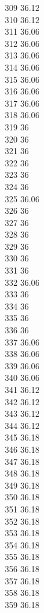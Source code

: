 309	36.12\\
310	36.12\\
311	36.06\\
312	36.06\\
313	36.06\\
314	36.06\\
315	36.06\\
316	36.06\\
317	36.06\\
318	36.06\\
319	36\\
320	36\\
321	36\\
322	36\\
323	36\\
324	36\\
325	36.06\\
326	36\\
327	36\\
328	36\\
329	36\\
330	36\\
331	36\\
332	36.06\\
333	36\\
334	36\\
335	36\\
336	36\\
337	36.06\\
338	36.06\\
339	36.06\\
340	36.06\\
341	36.12\\
342	36.12\\
343	36.12\\
344	36.12\\
345	36.18\\
346	36.18\\
347	36.18\\
348	36.18\\
349	36.18\\
350	36.18\\
351	36.18\\
352	36.18\\
353	36.18\\
354	36.18\\
355	36.18\\
356	36.18\\
357	36.18\\
358	36.18\\
359	36.18\\
